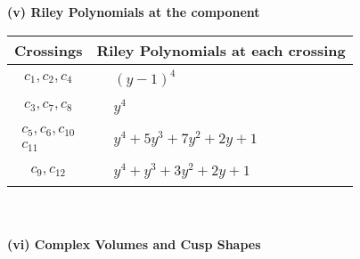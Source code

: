 \documentclass[1p]{elsarticle_modified}
\theoremstyle{definition}
\begin{document}
\newpage\renewcommand{\arraystretch}{1}
\flushleft \textbf{(v) Riley Polynomials at the component}\newline \\
\begin{tabular}{m{50pt}|m{274pt}}
Crossings & \hspace{64pt}Riley Polynomials at each crossing \\
\hline $$\begin{aligned}c_{1},c_{2},c_{4}\end{aligned}$$&$\begin{aligned}
&(y-1)^4
\end{aligned}$\\
\hline $$\begin{aligned}c_{3},c_{7},c_{8}\end{aligned}$$&$\begin{aligned}
&y^4
\end{aligned}$\\
\hline $$\begin{aligned}c_{5},c_{6},c_{10}\\c_{11}\end{aligned}$$&$\begin{aligned}
&y^4+5 y^3+7 y^2+2 y+1
\end{aligned}$\\
\hline $$\begin{aligned}c_{9},c_{12}\end{aligned}$$&$\begin{aligned}
&y^4+y^3+3 y^2+2 y+1
\end{aligned}$\\
\hline
\end{tabular}\\~\\
\newpage\flushleft \textbf{(vi) Complex Volumes and Cusp Shapes}
\end{document}
